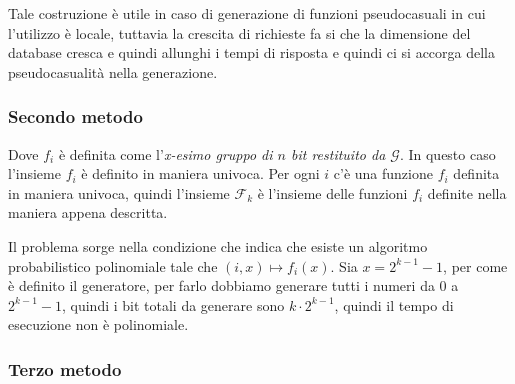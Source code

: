 Tale costruzione è utile in caso di generazione di funzioni pseudocasuali 
in cui l'utilizzo è locale, tuttavia la crescita di richieste fa si che 
la dimensione del database cresca e quindi allunghi i tempi di risposta e 
quindi ci si accorga della pseudocasualità nella generazione.
\subsubsection{Secondo metodo}
\begin{figure}[H]
  \centering
\end{figure}
Dove $f_i$ è definita come l'\textit{x-esimo gruppo di $n$ bit restituito da $\mathcal{G}$}.
In questo caso l'insieme $f_i$ è definito in maniera univoca. Per ogni $i$ c'è 
una funzione $f_i$ definita in maniera univoca, quindi l'insieme $\mathcal{F}_k$ è 
l'insieme delle funzioni $f_i$ definite nella maniera appena descritta.

Il problema sorge nella condizione che indica che esiste un algoritmo probabilistico
polinomiale tale che $(i,x) \mapsto f_i(x)$. Sia $x= 2^{k-1} - 1$, per come è 
definito il generatore, per farlo dobbiamo generare tutti i numeri da $0$ a $2^{k-1} - 1$,
quindi i bit totali da generare sono $k \cdot 2^{k-1}$, quindi il tempo di esecuzione
non è polinomiale.

\subsubsection{Terzo metodo}

